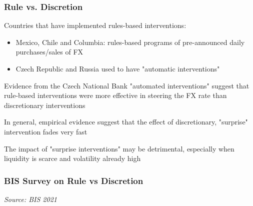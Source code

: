 \documentclass{beamer}
\newenvironment{wideitemize}{\itemize\addtolength{\itemsep}{10pt}}{\enditemize}
\begin{document}
\begin{frame}
  \frametitle{Rule vs. Discretion}

  \begin{wideitemize}

  \item Countries that have implemented rules-based interventions:
    \begin{itemize}
    \item Mexico, Chile and Columbia: rules-based programs of pre-announced daily purchases/sales of FX
    \item Czech Republic and Russia used to have "automatic interventions"
    \end{itemize}
  \item Evidence from the Czech National Bank \href{https://onlinelibrary.wiley.com/doi/10.1111/jmcb.12028}{} "automated interventions" suggest that rule-based interventions were more effective in steering the FX rate than discretionary interventions
  \item In general, empirical evidence suggest that the effect of discretionary, "surprise" intervention fades very fast    
  \item The impact of "surprise interventions" may be detrimental, especially when liquidity is scarce and volatility already high
  \end{wideitemize}  
\end{frame}


\begin{frame}
  \frametitle{BIS Survey on Rule vs Discretion}
  \medskip
  \emph{Source: BIS 2021 \href{https://www.bis.org/publ/mc_insights_fxinterventions.pdf}{}}
\end{frame}
\end{document}
